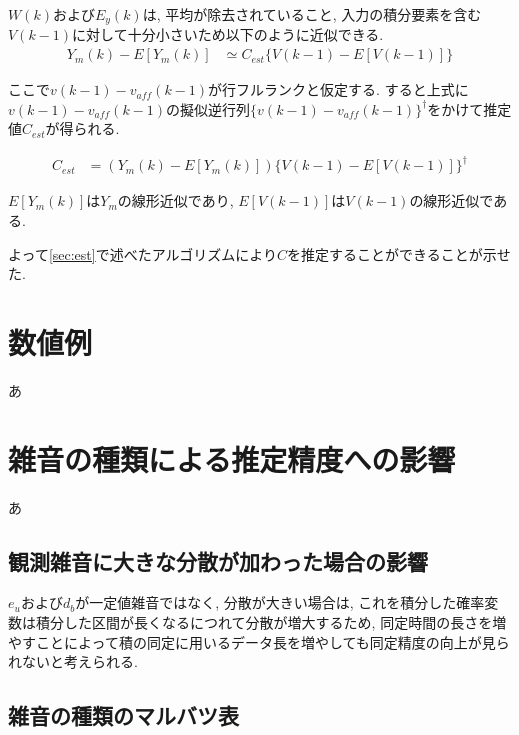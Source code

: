 \documentclass[a4paper,12pt]{jbook}
\begin{document}
$W(k)$および$E_y(k)$は, 平均が除去されていること, 入力の積分要素を含む$V(k-1)$に対して十分小さいため以下のように近似できる.
\begin{align}
Y_m(k) - E[Y_m(k)] &\simeq C_{est} \{V(k-1) -E[V(k-1)]\} \label{eqn:y=cv1}
\end{align}

ここで$v(k-1) - v_{aff}(k-1)$が行フルランクと仮定する. すると上式に$v(k-1) - v_{aff}(k-1)$の擬似逆行列$\{ v(k-1) - v_{aff}(k-1) \}^{\dagger}$をかけて推定値$C_{est}$が得られる.

\begin{align}
 C_{est} &= ( Y_m(k) -  E[Y_m(k)] ) \{ V(k-1) - E[V(k-1)] \}^{\dagger}  \label{eqn:cest} 
\end{align}

$E[Y_m(k)]$は$Y_m$の線形近似であり, $E[V(k-1)]$は$V(k-1)$の線形近似である.

よって\ref{sec:est}で述べたアルゴリズムにより$C$を推定することができることが示せた.
\chapter{数値例}
あ
\chapter{雑音の種類による推定精度への影響}
あ
\section{観測雑音に大きな分散が加わった場合の影響}

$e_u$および$d_b$が一定値雑音ではなく, 分散が大きい場合は, これを積分した確率変数は積分した区間が長くなるにつれて分散が増大するため, 同定時間の長さを増やすことによって積の同定に用いるデータ長を増やしても同定精度の向上が見られないと考えられる.
\section{雑音の種類のマルバツ表}
\end{document}

